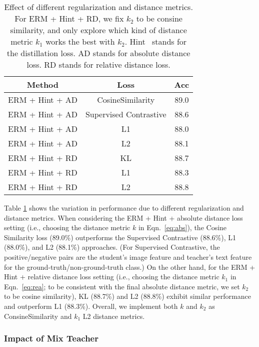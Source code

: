 \documentclass[10pt,twocolumn,letterpaper]{article}
\begin{document}
\begin{table}[htbp]
\begin{center}
\footnotesize
\begin{tabular}{c |  c |c }
\hline
Method & Loss & Acc \\
\hline \hline
\rowcolor{lightgray!30}ERM + Hint + AD & CosineSimilarity & 89.0\\
ERM + Hint + AD & Supervised Contrastive & 88.6\\
ERM + Hint + AD & L1 & 88.0\\
ERM + Hint + AD & L2 & 88.1\\
\hline
ERM + Hint + RD & KL & 88.7\\
ERM + Hint + RD & L1 & 88.3\\
\rowcolor{lightgray!30}ERM + Hint + RD & L2 & 88.8\\
\hline 
\end{tabular}
\vspace{5pt}
\caption{Effect of different regularization and distance metrics. For ERM + Hint + RD, we fix $k_2$ to be consine similarity, and only explore which kind of distance metric $k_1$ works the best with $k_2$. Hint~\cite{hinton2015distilling} stands for the distillation loss. AD stands for absolute distance loss. RD stands for relative distance loss.}
\label{table:distance}
\end{center}
\end{table}

Table \ref{table:distance} shows the variation in performance due to different regularization and distance metrics. When considering the ERM + Hint + absolute distance loss setting (i.e., choosing the distance metric $k$ in Eqn.~\ref{eq:abs}), the Cosine Similarity loss (89.0\%) outperforms the Supervised Contrastive (88.6\%), L1 (88.0\%), and L2 (88.1\%) approaches. (For Supervised Contrastive, the positive/negative pairs are the student's image feature and teacher's text feature for the ground-truth/non-ground-truth class.)  On the other hand, for the ERM + Hint + relative distance loss setting (i.e., choosing the distance metric $k_1$ in Eqn.~\ref{eq:rea}; to be consistent with the final absolute distance metric, we set $k_2$ to be cosine similarity), KL (88.7\%) and L2 (88.8\%) exhibit similar performance and outperform L1 (88.3\%). Overall, we implement both $k$ and $k_2$ as ConsineSimilarity and $k_1$ L2 distance metrics. 

\subsubsection{Impact of Mix Teacher}
\end{document}
